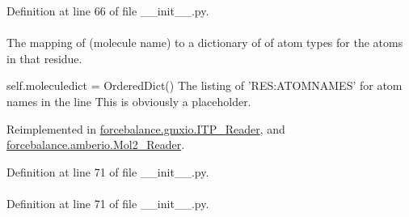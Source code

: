 \-Definition at line 66 of file \-\_\-\-\_\-init\-\_\-\-\_\-.\-py.

\hypertarget{classforcebalance_1_1BaseReader_ab444c213e15929253dd73395ac5f19fc}{
\paragraph[{molatom}]{}}\label{classforcebalance_1_1BaseReader_ab444c213e15929253dd73395ac5f19fc}


\-The mapping of (molecule name) to a dictionary of of atom types for the atoms in that residue. 

self.\-moleculedict = \-Ordered\-Dict() \-The listing of '\-R\-E\-S\-:\-A\-T\-O\-M\-N\-A\-M\-E\-S' for atom names in the line \-This is obviously a placeholder. 

\-Reimplemented in \hyperlink{classforcebalance_1_1gmxio_1_1ITP__Reader_a5ed800499e9442adaea0cee243960f94}{forcebalance.\-gmxio.\-I\-T\-P\-\_\-\-Reader}, and \hyperlink{classforcebalance_1_1amberio_1_1Mol2__Reader_acdeaabdae39b208fb9430ee4cd6de113}{forcebalance.\-amberio.\-Mol2\-\_\-\-Reader}.



\-Definition at line 71 of file \-\_\-\-\_\-init\-\_\-\-\_\-.\-py.

\hypertarget{classforcebalance_1_1BaseReader_a4369b5fb663a83b11602daa71db6862e}{
\paragraph[{\-Molecules}]{}}\label{classforcebalance_1_1BaseReader_a4369b5fb663a83b11602daa71db6862e}


\-Definition at line 71 of file \-\_\-\-\_\-init\-\_\-\-\_\-.\-py.

